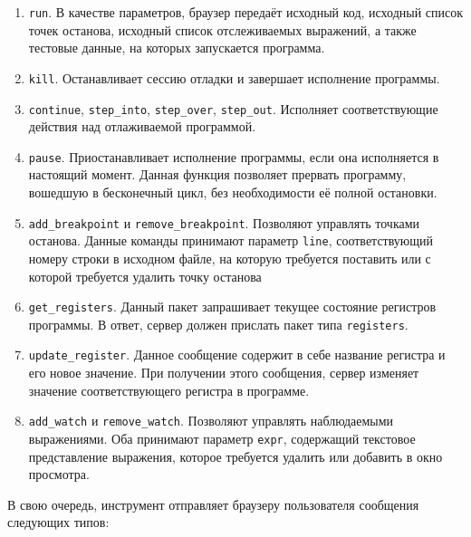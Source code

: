 \documentclass[a4paper,article,14pt]{extarticle}
\begin{document}
\begin{enumerate}
    \item \texttt{run}. В качестве параметров, браузер передаёт исходный код, исходный список точек останова, исходный список отслеживаемых выражений, а также тестовые данные, на которых запускается программа.
    \item \texttt{kill}. Останавливает сессию отладки и завершает исполнение программы.
    \item \texttt{continue}, \texttt{step\_into}, \texttt{step\_over}, \texttt{step\_out}. Исполняет соответствующие действия над отлаживаемой программой.
    \item \texttt{pause}. Приостанавливает исполнение программы, если она исполняется в настоящий момент. Данная функция позволяет прервать программу, вошедшую в бесконечный цикл, без необходимости её полной остановки.
    \item \texttt{add\_breakpoint} и \texttt{remove\_breakpoint}. Позволяют управлять точками останова. Данные команды принимают параметр \texttt{line}, соответствующий номеру строки в исходном файле, на которую требуется поставить или с которой требуется удалить точку останова
    \item \texttt{get\_registers}. Данный пакет запрашивает текущее состояние регистров программы. В ответ, сервер должен прислать пакет типа \texttt{registers}.
    \item \texttt{update\_register}. Данное сообщение содержит в себе название регистра и его новое значение. При получении этого сообщения, сервер изменяет значение соответствующего регистра в программе.
    \item \texttt{add\_watch} и \texttt{remove\_watch}. Позволяют управлять наблюдаемыми выражениями. Оба принимают параметр \texttt{expr}, содержащий текстовое представление выражения, которое требуется удалить или добавить в окно просмотра.
\end{enumerate}

В свою очередь, инструмент отправляет браузеру пользователя сообщения следующих типов:
\end{document}
